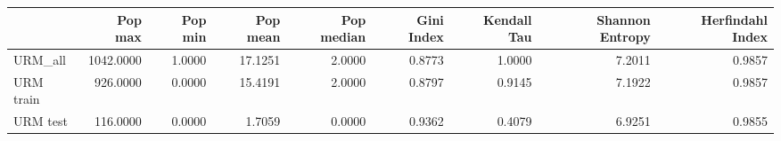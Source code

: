 \begin{tabular}{lrrrrrrrr}
\toprule
{} &   Pop max &  Pop min &  Pop mean &  Pop median &  Gini Index &  Kendall Tau &  Shannon Entropy &  Herfindahl Index \\
\midrule
URM\_all   & 1042.0000 &   1.0000 &   17.1251 &      2.0000 &      0.8773 &       1.0000 &           7.2011 &            0.9857 \\
URM train &  926.0000 &   0.0000 &   15.4191 &      2.0000 &      0.8797 &       0.9145 &           7.1922 &            0.9857 \\
URM test  &  116.0000 &   0.0000 &    1.7059 &      0.0000 &      0.9362 &       0.4079 &           6.9251 &            0.9855 \\
\bottomrule
\end{tabular}
